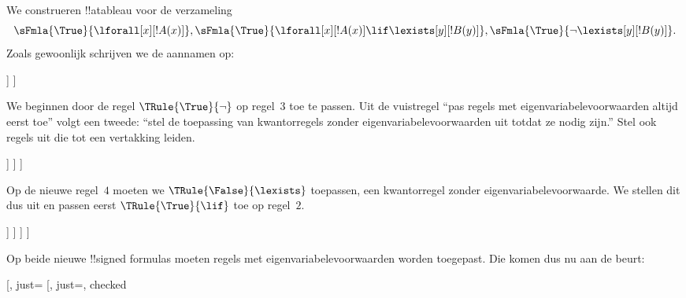 \documentclass[openany]{memoir}
\begin{document}
\begin{ex}
We construeren !!a{tableau} voor de verzameling
\[
\sFmla{\True}{\lforall[x][!A(x)]}, \sFmla{\True}{\lforall[x][!A(x)] 
  \lif \lexists[y][!B(y)]}, \sFmla{\True}{\lnot\lexists[y][!B(y)]}.
\]
Zoals gewoonlijk schrijven we de aannamen op:
\begin{oltableau}
  [\sFmla{\True}{\lforall[x][\formula{A}(x)]}, just=\TAss
    [\sFmla{\True}{\lforall[x][\formula{A}(x)] \lif
        \lexists[y][\formula{B}(y)]}, just=\TAss
      [\sFmla{\True}{\lnot\lexists[y][\formula{B}(y)]}, just=\TAss
      ]
    ]
  ]
\end{oltableau}
We beginnen door de regel $\TRule{\True}{\lnot}$ op regel~$3$ toe te
passen. Uit de vuistregel ``pas regels met eigenvariabelevoorwaarden
altijd eerst toe'' volgt een tweede: ``stel de toepassing van
kwantorregels zonder eigenvariabelevoorwaarden uit totdat ze nodig
zijn.'' Stel ook regels uit die tot een vertakking leiden.
\begin{oltableau}
  [\sFmla{\True}{\lforall[x][\formula{A}(x)]}, just=\TAss
    [\sFmla{\True}{\lforall[x][\formula{A}(x)] \lif
        \lexists[y][\formula{B}(y)]}, just=\TAss
      [\sFmla{\True}{\lnot\lexists[y][\formula{B}(y)]}, just=\TAss, checked
        [\sFmla{\False}{\lexists[y][\formula{B}(y)]}, just={\TRule{\True}{\lnot}[3]}]
      ]
    ]
  ]
\end{oltableau}
Op de nieuwe regel~$4$ moeten we $\TRule{\False}{\lexists}$ toepassen,
een kwantorregel zonder eigenvariabelevoorwaarde. We stellen dit dus uit
en passen eerst $\TRule{\True}{\lif}$ toe op regel~$2$.
\begin{oltableau}
  [\sFmla{\True}{\lforall[x][\formula{A}(x)]}, just=\TAss
    [\sFmla{\True}{\lforall[x][\formula{A}(x)] \lif
        \lexists[y][\formula{B}(y)]}, just=\TAss, checked
      [\sFmla{\True}{\lnot\lexists[y][\formula{B}(y)]}, just=\TAss, checked
        [\sFmla{\False}{\lexists[y][\formula{B}(y)]},
          just={\TRule{\True}{\lnot}[3]},
          [\sFmla{\False}{\lforall[x][\formula{A}(x)]}, just={\TRule{\True}{\lif}[2]}]
          [\sFmla{\True}{\lexists[y][\formula{B}(y)]}, just={\TRule{\True}{\lif}[2]}]
        ]
      ]
    ]
  ]
\end{oltableau}
Op beide nieuwe !!{signed formula}s moeten regels met
eigenvariabelevoorwaarden worden toegepast. Die komen dus nu aan de
beurt:
\begin{oltableau}
  [\sFmla{\True}{\lforall[x][\formula{A}(x)]}, just=\TAss
    [\sFmla{\True}{\lforall[x][\formula{A}(x)] \lif
        \lexists[y][\formula{B}(y)]}, just=\TAss, checked

\end{oltableau}
\end{ex}
\end{document}
